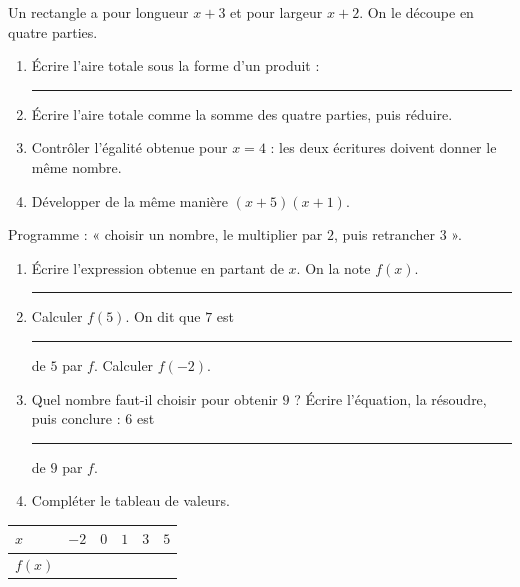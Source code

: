 \documentclass[10pt,a4paper]{article}
\begin{document}
Un rectangle a pour longueur $x+3$ et pour largeur $x+2$. On le découpe en quatre parties.
\begin{center}
\end{center}
\begin{enumerate}
\item Écrire l'aire totale sous la forme d'un produit : \rule{55mm}{0.32pt}
\item Écrire l'aire totale comme la somme des quatre parties, puis réduire.
\item Contrôler l'égalité obtenue pour $x = 4$ : les deux écritures doivent donner le même nombre.
\item Développer de la même manière $(x+5)(x+1)$.
\end{enumerate}

Programme : « choisir un nombre, le multiplier par $2$, puis retrancher $3$ ».
\begin{enumerate}
\item Écrire l'expression obtenue en partant de $x$. On la note $f(x)$. \rule{45mm}{0.32pt}
\item Calculer $f(5)$. On dit que $7$ est \rule{28mm}{0.32pt} de $5$ par $f$. \quad Calculer $f(-2)$.
\item Quel nombre faut-il choisir pour obtenir $9$ ? Écrire l'équation, la résoudre, puis conclure :
$6$ est \rule{28mm}{0.32pt} de $9$ par $f$.
\item Compléter le tableau de valeurs.
\end{enumerate}
\par\noindent\begin{tabularx}{\linewidth}{|>{\bfseries}p{18mm}|X|X|X|X|X|}
\hline
$x$ & $-2$ & $0$ & $1$ & $3$ & $5$ \\ \hline
$f(x)$ & & & & & \\ \hline
\end{tabularx}
\end{document}
